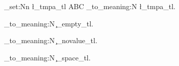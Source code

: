 \documentclass{article}
\begin{document}
\ExplSyntaxOn
\tl_set:Nn \l_tmpa_tl { ABC }
\token_to_meaning:N \l_tmpa_tl. \par
\token_to_meaning:N \c_empty_tl. \par
\token_to_meaning:N \c_novalue_tl. \par
\token_to_meaning:N \c_space_tl. \par
\ExplSyntaxOff
\end{document}
